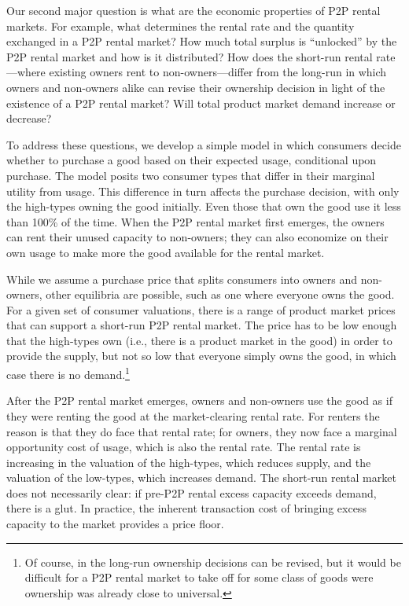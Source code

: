 \documentclass[11pt]{article}
\begin{document}
Our second major question is what are the economic properties of P2P rental markets. 
For example, what determines the rental rate and the quantity exchanged in a P2P rental market? 
How much total surplus is ``unlocked'' by the P2P rental market and how is it distributed? 
How does the short-run rental rate---where existing owners rent to non-owners---differ from the long-run in which owners and non-owners alike can revise their ownership decision in light of the existence of a P2P rental market?  
Will total product market demand increase or decrease?

To address these questions, we develop a simple model in which consumers decide whether to purchase a good based on their expected usage, conditional upon purchase. 
The model posits two consumer types that differ in their marginal utility from usage. 
This difference in turn affects the purchase decision, with only the high-types owning the good initially.  
Even those that own the good use it less than 100\% of the time. 
When the P2P rental market first emerges, the owners can rent their unused capacity to non-owners; they can also economize on their own usage to make more the good available for the rental market.

While we assume a purchase price that splits consumers into owners and non-owners, other equilibria are possible, such as one where everyone owns the good.
For a given set of consumer valuations, there is a range of product market prices that can support a short-run P2P rental market.
The price has to be low enough that the high-types own (i.e., there is a product market in the good) in order to provide the supply, but not so low that everyone simply owns the good, in which case there is no demand.\footnote{
  Of course, in the long-run ownership decisions can be revised, but it would be difficult for a P2P rental market to take off for some class of goods were ownership was already close to universal.
}   

After the P2P rental market emerges, owners and non-owners use the good as if they were renting the good at the market-clearing rental rate. 
For renters the reason is that they do face that rental rate; 
for owners, they now face a marginal opportunity cost of usage, which is also the rental rate. 
The rental rate is increasing in the valuation of the high-types, which reduces supply, and the valuation of the low-types, which increases demand. 
The short-run rental market does not necessarily clear: if pre-P2P rental excess capacity exceeds demand, there is a glut. 
In practice, the inherent transaction cost of bringing excess capacity to the market provides a price floor.     
\end{document}

